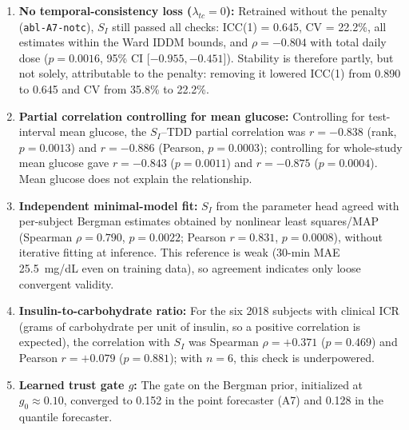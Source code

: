 \documentclass[journal]{IEEEtran}
\begin{document}
\begin{enumerate}
    \item \textbf{No temporal-consistency loss ($\lambda_{tc} = 0$):} Retrained without the penalty (\texttt{abl-A7-notc}), $S_I$ still passed all checks: ICC(1) = 0.645, CV = 22.2\%, all estimates within the Ward IDDM bounds, and $\rho = -0.804$ with total daily dose ($p = 0.0016$, 95\% CI [$-0.955, -0.451$]). Stability is therefore partly, but not solely, attributable to the penalty: removing it lowered ICC(1) from 0.890 to 0.645 and CV from 35.8\% to 22.2\%.
    \item \textbf{Partial correlation controlling for mean glucose:} Controlling for test-interval mean glucose, the $S_I$--TDD partial correlation was $r = -0.838$ (rank, $p = 0.0013$) and $r = -0.886$ (Pearson, $p = 0.0003$); controlling for whole-study mean glucose gave $r = -0.843$ ($p = 0.0011$) and $r = -0.875$ ($p = 0.0004$). Mean glucose does not explain the relationship.
    \item \textbf{Independent minimal-model fit:} $S_I$ from the parameter head agreed with per-subject Bergman estimates obtained by nonlinear least squares/MAP (Spearman $\rho = 0.790$, $p = 0.0022$; Pearson $r = 0.831$, $p = 0.0008$), without iterative fitting at inference. This reference is weak (30-min MAE 25.5~mg/dL even on training data), so agreement indicates only loose convergent validity.
    \item \textbf{Insulin-to-carbohydrate ratio:} For the six 2018 subjects with clinical ICR (grams of carbohydrate per unit of insulin, so a positive correlation is expected), the correlation with $S_I$ was Spearman $\rho = +0.371$ ($p = 0.469$) and Pearson $r = +0.079$ ($p = 0.881$); with $n = 6$, this check is underpowered.
    \item \textbf{Learned trust gate $g$:} The gate on the Bergman prior, initialized at $g_0 \approx 0.10$, converged to 0.152 in the point forecaster (A7) and 0.128 in the quantile forecaster.
\end{enumerate}
\end{document}
